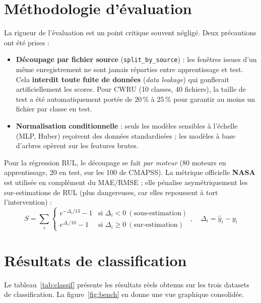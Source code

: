 \section{Méthodologie d'évaluation}
La rigueur de l'évaluation est un point critique souvent négligé. Deux précautions ont été
prises :
\begin{itemize}[leftmargin=1.5em]
  \item \textbf{Découpage par fichier source} (\texttt{split\_by\_source}) : les fenêtres
        issues d'un même enregistrement ne sont jamais réparties entre apprentissage et
        test. Cela \textbf{interdit toute fuite de données} (\emph{data leakage}) qui
        gonflerait artificiellement les scores. Pour CWRU (10 classes, 40 fichiers), la
        taille de test a été automatiquement portée de 20\,\% à 25\,\% pour garantir au
        moins un fichier par classe en test.
  \item \textbf{Normalisation conditionnelle} : seuls les modèles sensibles à l'échelle
        (MLP, Huber) reçoivent des données standardisées ; les modèles à base d'arbres
        opèrent sur les features brutes.
\end{itemize}
Pour la régression RUL, le découpage se fait \emph{par moteur} (80 moteurs en apprentissage,
20 en test, sur les 100 de CMAPSS). La métrique officielle \textbf{NASA} est utilisée en
complément du MAE/RMSE ; elle pénalise asymétriquement les sur-estimations de RUL (plus
dangereuses, car elles repoussent à tort l'intervention) :
\begin{equation}
S = \sum_i
\begin{cases}
e^{-\Delta_i/13} - 1 & \text{si } \Delta_i < 0 \ (\text{sous-estimation})\\
e^{\Delta_i/10} - 1 & \text{si } \Delta_i \ge 0 \ (\text{sur-estimation})
\end{cases},\quad \Delta_i = \hat{y}_i - y_i
\end{equation}

\section{Résultats de classification}
Le tableau~\ref{tab:classif} présente les résultats réels obtenus sur les trois datasets de
classification. La figure~\ref{fig:bench} en donne une vue graphique consolidée.

